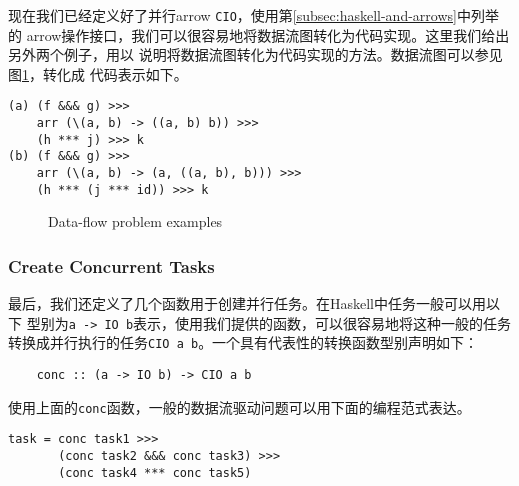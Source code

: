 \documentclass[conference]{IEEEtran}
\begin{document}
现在我们已经定义好了并行arrow \texttt{CIO}，使用第\ref{subsec:haskell-and-arrows}中列举的
arrow操作接口，我们可以很容易地将数据流图转化为代码实现。这里我们给出另外两个例子，用以
说明将数据流图转化为代码实现的方法。数据流图可以参见图\ref{fig:examples}，转化成
代码表示如下。
\begin{verbatim}
(a) (f &&& g) >>>
    arr (\(a, b) -> ((a, b) b)) >>>
    (h *** j) >>> k
(b) (f &&& g) >>>
    arr (\(a, b) -> (a, ((a, b), b))) >>>
    (h *** (j *** id)) >>> k
\end{verbatim}
\begin{figure}
  \centerline{
    \hfil
  }
  \caption{Data-flow problem examples}
  \label{fig:examples}
\end{figure}

\subsubsection{Create Concurrent Tasks}
最后，我们还定义了几个函数用于创建并行任务。在Haskell中任务一般可以用以下
型别为\texttt{a -> IO b}表示，使用我们提供的函数，可以很容易地将这种一般的任务
转换成并行执行的任务\texttt{CIO a b}。一个具有代表性的转换函数型别声明如下：
\begin{verbatim}
    conc :: (a -> IO b) -> CIO a b
\end{verbatim}
使用上面的\texttt{conc}函数，一般的数据流驱动问题可以用下面的编程范式表达。
\begin{verbatim}
task = conc task1 >>>
       (conc task2 &&& conc task3) >>>
       (conc task4 *** conc task5)
\end{verbatim}
\end{document}
